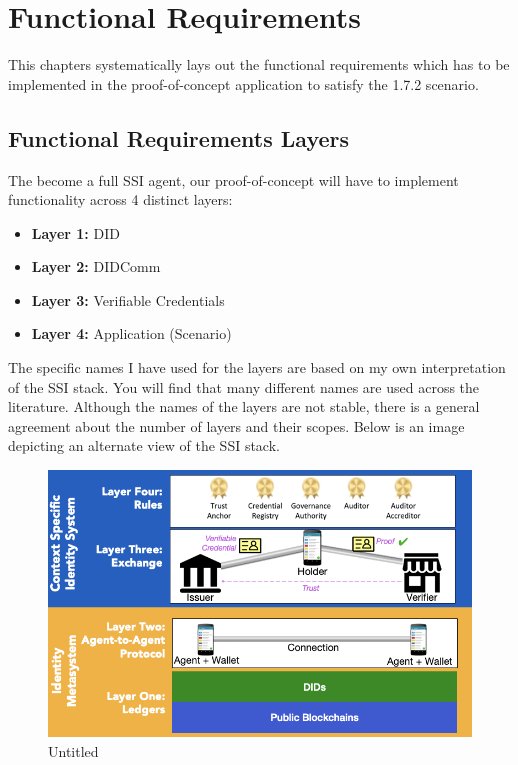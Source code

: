 \hypertarget{functional-requirements}{%
\chapter{Functional Requirements}\label{functional-requirements}}

This chapters systematically lays out the functional requirements which
has to be implemented in the proof-of-concept application to satisfy the
1.7.2 scenario.

\hypertarget{functional-requirements-layers}{%
\section{Functional Requirements
Layers}\label{functional-requirements-layers}}

The become a full SSI agent, our proof-of-concept will have to implement
functionality across 4 distinct layers:

\begin{itemize}
\tightlist
\item
  \textbf{Layer 1:} DID
\item
  \textbf{Layer 2:} DIDComm
\item
  \textbf{Layer 3:} Verifiable Credentials
\item
  \textbf{Layer 4:} Application (Scenario)
\end{itemize}

The specific names I have used for the layers are based on my own
interpretation of the SSI stack. You will find that many different names
are used across the literature. Although the names of the layers are not
stable, there is a general agreement about the number of layers and
their scopes. Below is an image depicting an alternate view of the SSI
stack.

\begin{figure}
\centering
\includegraphics{Functional Requirements b66771c223f2424c9b1ba3285a2ba469/Untitled.png}
\caption{Untitled}
\end{figure}

